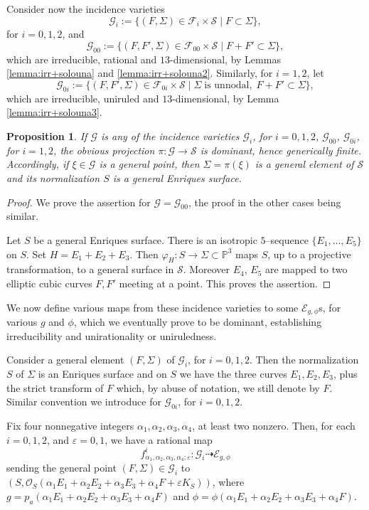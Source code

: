 \documentclass[11pt]{amsart}
\newtheorem{prop}[thm]{Proposition}
\theoremstyle{definition}
\def\PP{{\mathbb P}}
\def\SS{{\mathcal S}}
\def\G{{\mathcal G}}
\def\O{{\mathcal O}}
\def\E{{\mathcal E}}
\def\F{{\mathcal F}}
\def\x{\times}                   %
\begin{document}
Consider now the incidence varieties
\[ \G_i :=\{ (F,\Sigma) \in \F_i \x \SS \; | \; F \subset \Sigma\},\]
for $i=0,1,2$, 
and
\[ \G_{00} :=\{ (F,F',\Sigma) \in \F_{00} \x \SS \; | \; F+F' \subset \Sigma\},\]
which are irreducible, rational and $13$-dimensional, by Lemmas \ref{lemma:irr+solouna} and \ref{lemma:irr+solouna2}. Similarly, for $i=1,2$, let
\[ \G_{0i} :=\{ (F,F',\Sigma) \in \F_{0i} \x \SS \; | \; \Sigma \; \mbox{is unnodal}, \; F+F' \subset \Sigma\},\]
which are irreducible, uniruled and $13$-dimensional, by Lemma \ref{lemma:irr+solouna3}. 



\begin{prop}\label{prop:domin} If $\G$ is any of the incidence varieties $\G_i$, for $i=0,1,2$, $\G_{00}$, $ \G_{0i}$, for $i=1,2$, the obvious projection  $\pi: \G\to \SS$ is dominant, hence generically finite. Accordingly, if $\xi\in \G$ is a general point, then $\Sigma=\pi(\xi)$ is a general element of $\SS$ and its normalization $S$ is a general Enriques surface.
\end{prop}

\begin{proof} We prove the assertion for $\G=\G_{00}$, the proof in the other cases being similar.

Let $S$ be a general Enriques surface. There is  an isotropic $5$--sequence $\{E_1,\ldots,E_5\}$ on $S$.  Set $H=E_1+E_2+E_3$. Then $\varphi_H: S\to \Sigma\subset \PP^ 3$ maps $S$, up to a projective transformation, to a general surface in 
$\mathcal S$. Moreover $E_4$, $E_5$ are mapped to two elliptic cubic curves $F,F'$ meeting at a point. This proves the assertion. \end{proof} 


We now define various maps from these incidence varieties to some $\E_{g,\phi}$s, for various $g$ and $\phi$, which we eventually prove to be dominant, establishing irreducibility and unirationality or uniruledness. 

Consider a general element $(F,\Sigma)$ of $\G_i$, for $i=0,1,2$. Then the normalization $S$ of  $\Sigma$ is an Enriques surface and on $S$ we have the three curves $E_1,E_2,E_3$, plus the strict transform of $F$ which, by abuse of notation, we still denote by $F$. Similar convention we introduce for  $\G_{0i}$, for  $i=0,1,2$.

Fix four nonnegative integers $\alpha_1,\alpha_2,\alpha_3,\alpha_4$, at least two nonzero.  Then, for each $i=0,1,2$,  and $\varepsilon=0,1$,  we have a rational map
\[ f^i_{\alpha_1,\alpha_2,\alpha_3, \alpha_4; \varepsilon}: \G_i \dasharrow \E_{g,\phi}\]
sending the general point $(F, \Sigma)\in \G_i$
to $\left(S,\O_{S}(\alpha_1E_1+\alpha_2E_2+\alpha_3E_3+\alpha_4F+\varepsilon K_S)\right)$, where $g=p_a(\alpha_1E_1+\alpha_2E_2+\alpha_3E_3+\alpha_4F)$  and $\phi=\phi(\alpha_1E_1+\alpha_2E_2+\alpha_3E_3+\alpha_4F)$. 
\end{document}
